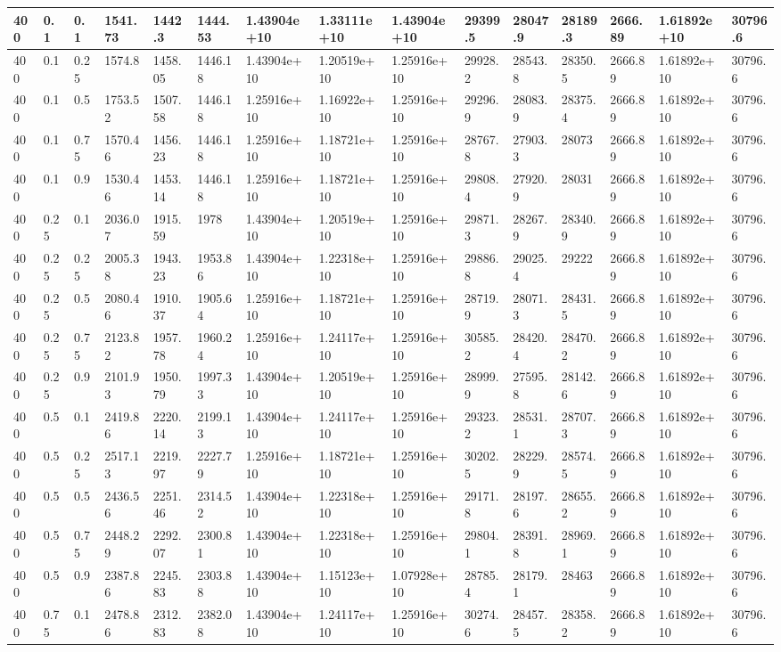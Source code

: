 \begin{table}[!htbp]
\begin{tabularx}{\textwidth}{|p{0.4cm}|*{2}{p{0.2cm}|}*{12}{X|}}
400&0.1&0.1&1541.73&1442.3&1444.53&1.43904e+10&1.33111e+10&1.43904e+10&29399.5&28047.9&28189.3&2666.89&1.61892e+10&30796.6\\\hline
400&0.1&0.25&1574.8&1458.05&1446.18&1.43904e+10&1.20519e+10&1.25916e+10&29928.2&28543.8&28350.5&2666.89&1.61892e+10&30796.6\\\hline
400&0.1&0.5&1753.52&1507.58&1446.18&1.25916e+10&1.16922e+10&1.25916e+10&29296.9&28083.9&28375.4&2666.89&1.61892e+10&30796.6\\\hline
400&0.1&0.75&1570.46&1456.23&1446.18&1.25916e+10&1.18721e+10&1.25916e+10&28767.8&27903.3&28073&2666.89&1.61892e+10&30796.6\\\hline
400&0.1&0.9&1530.46&1453.14&1446.18&1.25916e+10&1.18721e+10&1.25916e+10&29808.4&27920.9&28031&2666.89&1.61892e+10&30796.6\\\hline
400&0.25&0.1&2036.07&1915.59&1978&1.43904e+10&1.20519e+10&1.25916e+10&29871.3&28267.9&28340.9&2666.89&1.61892e+10&30796.6\\\hline
400&0.25&0.25&2005.38&1943.23&1953.86&1.43904e+10&1.22318e+10&1.25916e+10&29886.8&29025.4&29222&2666.89&1.61892e+10&30796.6\\\hline
400&0.25&0.5&2080.46&1910.37&1905.64&1.25916e+10&1.18721e+10&1.25916e+10&28719.9&28071.3&28431.5&2666.89&1.61892e+10&30796.6\\\hline
400&0.25&0.75&2123.82&1957.78&1960.24&1.25916e+10&1.24117e+10&1.25916e+10&30585.2&28420.4&28470.2&2666.89&1.61892e+10&30796.6\\\hline
400&0.25&0.9&2101.93&1950.79&1997.33&1.43904e+10&1.20519e+10&1.25916e+10&28999.9&27595.8&28142.6&2666.89&1.61892e+10&30796.6\\\hline
400&0.5&0.1&2419.86&2220.14&2199.13&1.43904e+10&1.24117e+10&1.25916e+10&29323.2&28531.1&28707.3&2666.89&1.61892e+10&30796.6\\\hline
400&0.5&0.25&2517.13&2219.97&2227.79&1.25916e+10&1.18721e+10&1.25916e+10&30202.5&28229.9&28574.5&2666.89&1.61892e+10&30796.6\\\hline
400&0.5&0.5&2436.56&2251.46&2314.52&1.43904e+10&1.22318e+10&1.25916e+10&29171.8&28197.6&28655.2&2666.89&1.61892e+10&30796.6\\\hline
400&0.5&0.75&2448.29&2292.07&2300.81&1.43904e+10&1.22318e+10&1.25916e+10&29804.1&28391.8&28969.1&2666.89&1.61892e+10&30796.6\\\hline
400&0.5&0.9&2387.86&2245.83&2303.88&1.43904e+10&1.15123e+10&1.07928e+10&28785.4&28179.1&28463&2666.89&1.61892e+10&30796.6\\\hline
400&0.75&0.1&2478.86&2312.83&2382.08&1.43904e+10&1.24117e+10&1.25916e+10&30274.6&28457.5&28358.2&2666.89&1.61892e+10&30796.6\\\hline

\end{tabularx}
\end{table}
